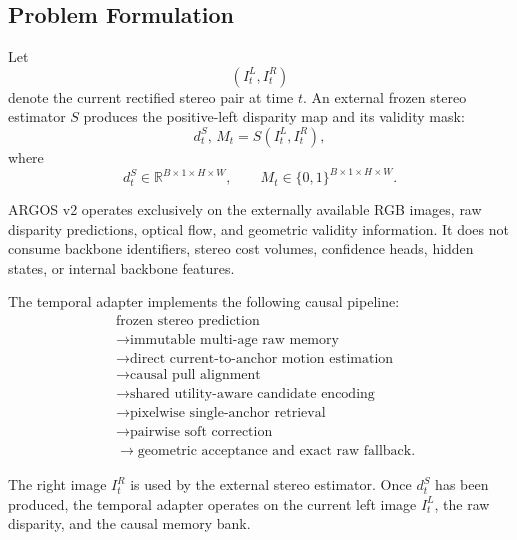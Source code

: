 \documentclass[11pt,a4paper]{article}
\begin{document}
\subsection{Problem Formulation}
\label{sec:problem_formulation}

Let
%
\begin{equation}
\left(I_t^L,I_t^R\right)
\end{equation}
%
denote the current rectified stereo pair at time \(t\).
An external frozen stereo estimator \(S\) produces the positive-left
disparity map and its validity mask:
%
\begin{equation}
d_t^S,\,M_t
=
S\left(I_t^L,I_t^R\right),
\label{eq:frozen_stereo}
\end{equation}
%
where
%
\begin{equation}
d_t^S\in\mathbb{R}^{B\times1\times H\times W},
\qquad
M_t\in\{0,1\}^{B\times1\times H\times W}.
\end{equation}

ARGOS v2 operates exclusively on the externally available RGB images,
raw disparity predictions, optical flow, and geometric validity
information. It does not consume backbone identifiers, stereo cost
volumes, confidence heads, hidden states, or internal backbone features.

The temporal adapter implements the following causal pipeline:
%
\begin{equation}
\boxed{
\begin{aligned}
&\text{frozen stereo prediction}
\\[-1mm]
&\rightarrow
\text{immutable multi-age raw memory}
\\[-1mm]
&\rightarrow
\text{direct current-to-anchor motion estimation}
\\[-1mm]
&\rightarrow
\text{causal pull alignment}
\\[-1mm]
&\rightarrow
\text{shared utility-aware candidate encoding}
\\[-1mm]
&\rightarrow
\text{pixelwise single-anchor retrieval}
\\[-1mm]
&\rightarrow
\text{pairwise soft correction}
\\[-1mm]
&\rightarrow
\text{geometric acceptance and exact raw fallback}.
\end{aligned}
}
\label{eq:overall_pipeline}
\end{equation}

The right image \(I_t^R\) is used by the external stereo estimator.
Once \(d_t^S\) has been produced, the temporal adapter operates on the
current left image \(I_t^L\), the raw disparity, and the causal memory
bank.
\end{document}
